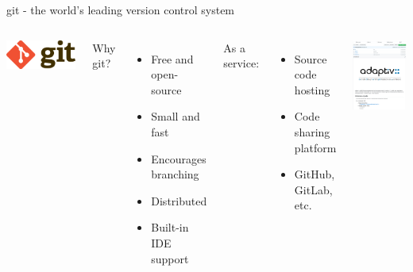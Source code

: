 \documentclass{beamer}
\begin{document}
\begin{frame}{git - the world's leading version control system}
	\begin{columns}[onlytextwidth]
		\begin{center}
			\hspace{-1.7cm}
			\includegraphics[keepaspectratio=true, width=0.45\linewidth]{figures/git.png}
		\end{center}
		Why git?
		\begin{itemize}
			\item Free and open-source
			\item Small and fast
			\item Encourages branching
			\item Distributed
			\item Built-in IDE support
		\end{itemize}
		As a service:
		\begin{itemize}
			\item Source code hosting
			\item Code sharing platform
			\item GitHub, GitLab, etc.
		\end{itemize}
		\includegraphics[keepaspectratio=true, width=0.95\linewidth]{figures/github.png}
	\end{columns}
\end{frame}
\end{document}
